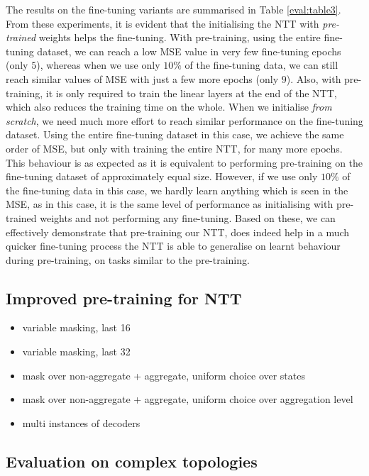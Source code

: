 The results on the fine-tuning variants are summarised in Table \ref{eval:table3}. From these experiments, it is evident that the initialising the NTT with \emph{pre-trained} weights helps the fine-tuning. With pre-training, using the entire fine-tuning dataset, we can reach a low MSE value in very few fine-tuning epochs (only $5$), whereas when we use only $10\%$ of the fine-tuning data, we can still reach similar values of MSE with just a few more epochs (only $9$). Also, with pre-training, it is only required to train the linear layers at the end of the NTT, which also reduces the training time on the whole. When we initialise \emph{from scratch}, we need much more effort to reach similar performance on the fine-tuning dataset. Using the entire fine-tuning dataset in this case, we achieve the same order of MSE, but only with training the entire NTT, for many more epochs. This behaviour is as expected as it is equivalent to performing pre-training on the fine-tuning dataset of approximately equal size. However, if we use only $10\%$ of the fine-tuning data in this case, we hardly learn anything which is seen in the MSE, as in this case, it is the same level of performance as initialising with pre-trained weights and not performing any fine-tuning. Based on these, we can effectively demonstrate that pre-training our NTT, does indeed help in a much quicker fine-tuning process \ie the NTT is able to generalise on learnt behaviour during pre-training, on tasks similar to the pre-training.


\subsection{Improved pre-training for NTT}
\label{ssec:impptt}

\begin{itemize}
\item variable masking, last 16
\item variable masking, last 32
\item mask over non-aggregate + aggregate, uniform choice over states
\item mask over non-aggregate + aggregate, uniform choice over aggregation level 
\item multi instances of decoders 
\end{itemize}

\subsection{Evaluation on complex topologies}
\label{ssec:comptop}



